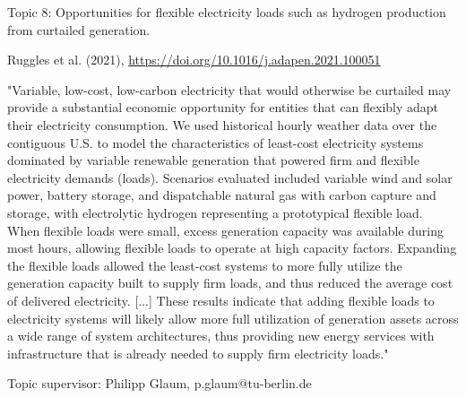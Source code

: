 \documentclass[10pt,aspectratio=169,dvipsnames]{beamer}
\begin{document}
\begin{frame}
  \begin{block}{Topic 8: Opportunities for flexible electricity loads such as hydrogen production from curtailed generation.}
      
    Ruggles et al. (2021), 
    \href{https://doi.org/10.1016/j.adapen.2021.100051}{https://doi.org/10.1016/j.adapen.2021.100051}
    
    "Variable, low-cost, low-carbon electricity that would otherwise be curtailed may provide a substantial economic opportunity for entities that can flexibly adapt their electricity consumption. We used historical hourly weather data over the contiguous U.S. to model the characteristics of least-cost electricity systems dominated by variable renewable generation that powered firm and flexible electricity demands (loads). Scenarios evaluated included variable wind and solar power, battery storage, and dispatchable natural gas with carbon capture and storage, with electrolytic hydrogen representing a prototypical flexible load. When flexible loads were small, excess generation capacity was available during most hours, allowing flexible loads to operate at high capacity factors. Expanding the flexible loads allowed the least-cost systems to more fully utilize the generation capacity built to supply firm loads, and thus reduced the average cost of delivered electricity. [...] These results indicate that adding flexible loads to electricity systems will likely allow more full utilization of generation assets across a wide range of system architectures, thus providing new energy services with infrastructure that is already needed to supply firm electricity loads."

    \hfill
    Topic supervisor:  Philipp Glaum, p.glaum@tu-berlin.de
    
  \end{block}
\end{frame}
\end{document}
